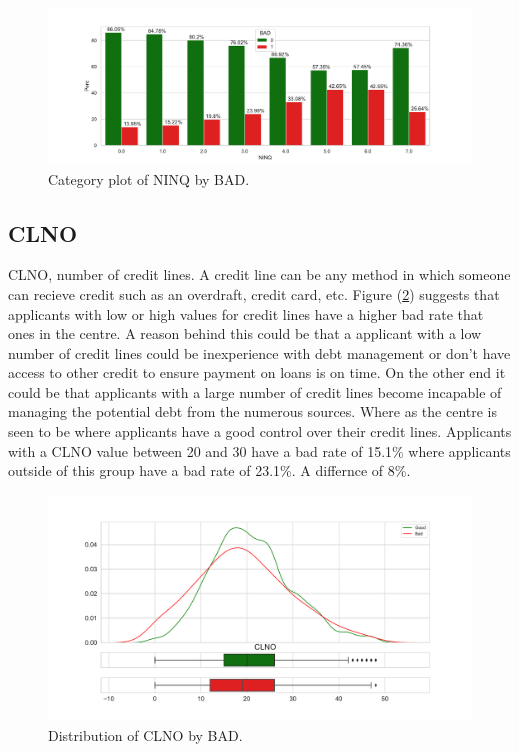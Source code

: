 \begin{figure}[!ht]
	\centering
	\includegraphics[scale=0.40]{figs/ninq_cat.pdf}
	\caption{Category plot of NINQ by BAD. \label{ninq_cat}}
\end{figure}

\subsection*{CLNO}

CLNO, number of credit lines. A credit line can be any method in which someone can recieve credit such as an overdraft, credit card, etc. Figure (\ref{clno_dist}) suggests that applicants with low or high values for credit lines have a higher bad rate that ones in the centre. A reason behind this could be that a applicant with a low number of credit lines could be inexperience with debt management or don't have access to other credit to ensure payment on loans is on time. On the other end it could be that applicants with a large number of credit lines become incapable of managing the potential debt from the numerous sources. Where as the centre is seen to be where applicants have a good control over their credit lines. Applicants with a CLNO value between 20 and 30 have a bad rate of 15.1\% where applicants outside of this group have a bad rate of 23.1\%. A differnce of 8\%.

\begin{figure}[!ht]
	\centering
	\includegraphics[scale=0.40]{figs/clno_dist.pdf}
	\caption{Distribution of CLNO by BAD. \label{clno_dist}}
\end{figure}

